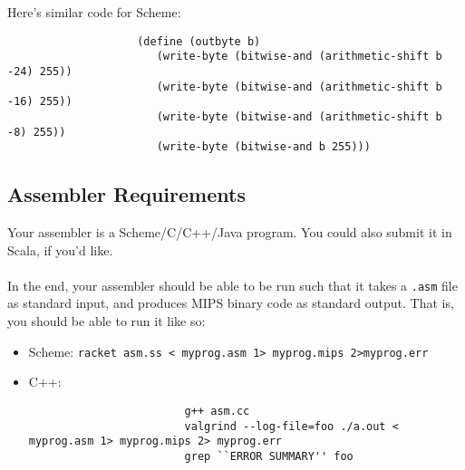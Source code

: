 \documentclass[]{article}
\theoremstyle{definition}
\newcommand{\lecture}[1]{\marginpar{{\footnotesize $\leftarrow$ \underline{#1}}}}
\begin{document}
				Here's similar code for Scheme:
				\begin{verbatim}
					(define (outbyte b)
					   (write-byte (bitwise-and (arithmetic-shift b -24) 255))
					   (write-byte (bitwise-and (arithmetic-shift b -16) 255))
					   (write-byte (bitwise-and (arithmetic-shift b -8) 255))
					   (write-byte (bitwise-and b 255)))
				\end{verbatim}
		\subsection{Assembler Requirements} \lecture{January 25, 2013}
			Your assembler is a Scheme/C/C++/Java program. You could also submit it in Scala, if you'd like.
			\\ \\
			In the end, your assembler should be able to be run such that it takes a \verb+.asm+ file as standard input, and produces MIPS binary code as standard output. That is, you should be able to run it like so:
			\begin{itemize}
				\item Scheme: \verb+racket asm.ss < myprog.asm 1> myprog.mips 2>myprog.err+
				\item C++:
					\begin{verbatim}
						g++ asm.cc
						valgrind --log-file=foo ./a.out < myprog.asm 1> myprog.mips 2> myprog.err
						grep ``ERROR SUMMARY'' foo
					\end{verbatim}
			\end{itemize}
				
\end{document}
